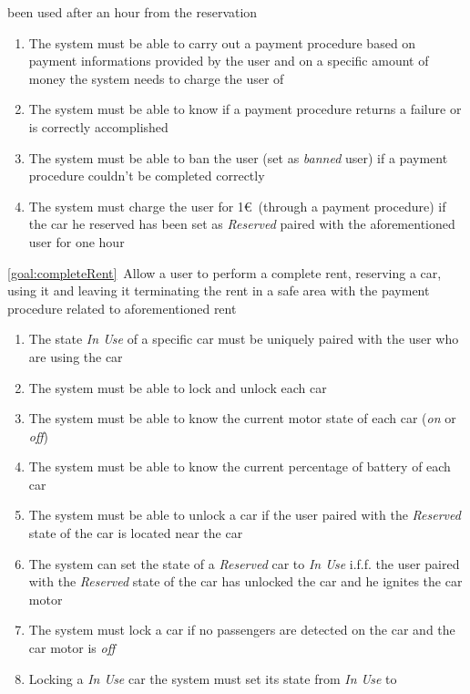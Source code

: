 \begin{description}
  		been used after an hour from the reservation
  			\begin{enumerate}[resume*]
  				\item The system must be able to carry out a payment procedure based on payment
  				informations provided by the user and on a specific amount of money the system needs to
  				charge the user of
  				\item The system must be able to know if a payment procedure returns a failure or is
  				correctly accomplished
  				\item The system must be able to ban the user (set as \emph{banned} user) if a payment
  				procedure couldn't be completed correctly
  				\item The system must charge the user for 1\euro\ (through a payment procedure) if the
  				car he reserved has been set as \emph{Reserved} paired with the aforementioned user for
  				one hour
   			\end{enumerate}
  		\item \ref{goal:completeRent}\ Allow a user to perform a complete rent, reserving a car, using
  		it and leaving it terminating the rent in a safe area with the payment procedure related to
  		aforementioned rent
  			\begin{enumerate}[resume*]
  			    \item The state \emph{In Use} of a specific car must be uniquely paired with the user who
  				are using the car	
  				\item The system must be able to lock and unlock each car
  				\item The system must be able to know the current motor state of each car (\emph{on}
  				or \emph{off})
  				\item The system must be able to know the current percentage of battery of each car
  				\item The system must be able to unlock a car if the user paired with the
  				\emph{Reserved} state of the car is located near  the car
  				\item The system can set the state of a \emph{Reserved} car to \emph{In Use} i.f.f. the
  				user paired with the \emph{Reserved} state of the car has unlocked the car and he ignites
  				the car motor
  				\item The system must lock a car if no passengers are detected on the car and the car
  				motor is \emph{off}
  				\item Locking a \emph{In Use} car the system must set its state from \emph{In Use} to

\end{enumerate}
\end{description}
